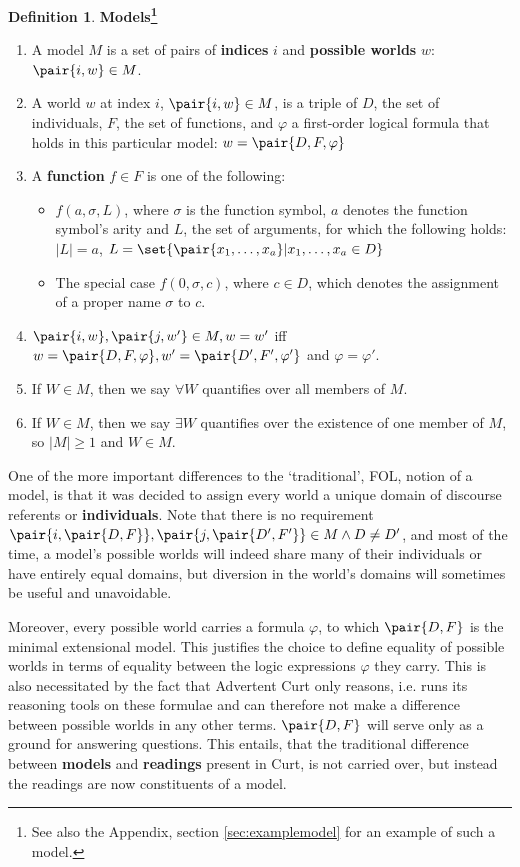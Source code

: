 \documentclass[a4paper]{article}
\newcommand{\abbr}{\textsf} %
\newcommand{\stress}{\textbf} %
\newcommand{\term}[1]{\textsf{\textbf{#1}}} %
\newcommand{\pn}{\textsf} %
\newcommand{\curt}{\pn{Curt}}
\newcommand{\acurt}{\pn{Advertent Curt}}
\theoremstyle{remark}
\theoremstyle{remark}
\theoremstyle{definition}
\newtheorem{definition}[thm]{Definition}
\theoremstyle{definition}
\begin{document}
\begin{definition}\label{Models}
  \stress{Models\footnote{See also the Appendix, section \ref{sec:examplemodel}
  for an example of such a model.}}
  \begin{enumerate}
    \item A model $M$ is a set of pairs of \term{indices} $i$ and \term{possible
    worlds} $w$: $\pair{i,w} \in M$. 
    \item A world $w$ at index $i$, $\pair{i,w} \in M$, is a triple of $D$, the set
    of individuals, $F$, the set of functions, and $\varphi$ a first-order
    logical formula that holds in this particular model: $w = \pair{D,F,\varphi}$
    \item A \term{function} $f \in F$ is one of the following: 
    \begin{itemize}
      \item $f(a,\sigma,L)$, where $\sigma$ is the function symbol, $a$ denotes
      the function symbol's arity and $L$, the set of arguments, for which the
      following holds: $|L| = a$,
      $L = \set{\pair{x_1,\ldots{},x_a}|x_1,\ldots{},x_a \in D}$
      \item The special case $f(0,\sigma,c)$, where $c \in D$, which denotes the
      assignment of a proper name $\sigma$ to $c$.
    \end{itemize}
    \item $\pair{i,w}, \pair{j,w'} \in M, w = w'$ iff $w = \pair{D,F,\varphi}, w' =
    \pair{D',F',\varphi'}$ and $\varphi = \varphi'$.
    \item If $W \in M$, then we say $\forall W$ quantifies over all members of $M$.
    \item If $W \in M$, then we say $\exists W$ quantifies over the existence of
    one member of $M$, so $|M| \geq 1$ and $W \in M$.
  \end{enumerate}
\end{definition}

One of the more important differences to the `traditional', \abbr{FOL}, notion of a model, is
that it was decided to assign every world a unique domain of discourse referents
or \term{individuals}. Note that there is no requirement $\pair{i,\pair{D,F}},
\pair{j,\pair{D',F'}} \in M \wedge D\neq D'$, and most of the time, a model's
possible worlds will indeed share many of their individuals or have entirely
equal domains, but diversion in the world's domains will sometimes be useful and
unavoidable.

Moreover, every possible world carries a formula $\varphi$, to which $\pair{D,F}$
is the minimal extensional model. This justifies the choice to define equality
of possible worlds in terms of equality between the logic expressions $\varphi$
they carry. This is also necessitated by the fact that \acurt{}  only reasons,
i.e. runs its reasoning tools on these formulae and can therefore not make a
difference between possible worlds in any other terms. $\pair{D,F}$ will serve
only as a ground for answering questions. This entails, that the traditional
difference between \term{models} and \term{readings} present in \curt, is not
carried over, but instead the readings are now constituents of a model.
\end{document}

